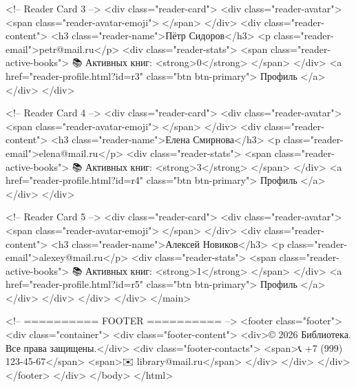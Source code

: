           <!-- Reader Card 3 -->
          <div class="reader-card">
            <div class="reader-avatar">
              <span class="reader-avatar-emoji">👤</span>
            </div>
            <div class="reader-content">
              <h3 class="reader-name">Пётр Сидоров</h3>
              <p class="reader-email">petr@mail.ru</p>
              <div class="reader-stats">
                <span class="reader-active-books">
                  📚 Активных книг: <strong>0</strong>
                </span>
              </div>
              <a href="reader-profile.html?id=r3" class="btn btn-primary">
                Профиль
              </a>
            </div>
          </div>

          <!-- Reader Card 4 -->
          <div class="reader-card">
            <div class="reader-avatar">
              <span class="reader-avatar-emoji">👤</span>
            </div>
            <div class="reader-content">
              <h3 class="reader-name">Елена Смирнова</h3>
              <p class="reader-email">elena@mail.ru</p>
              <div class="reader-stats">
                <span class="reader-active-books">
                  📚 Активных книг: <strong>3</strong>
                </span>
              </div>
              <a href="reader-profile.html?id=r4" class="btn btn-primary">
                Профиль
              </a>
            </div>
          </div>

          <!-- Reader Card 5 -->
          <div class="reader-card">
            <div class="reader-avatar">
              <span class="reader-avatar-emoji">👤</span>
            </div>
            <div class="reader-content">
              <h3 class="reader-name">Алексей Новиков</h3>
              <p class="reader-email">alexey@mail.ru</p>
              <div class="reader-stats">
                <span class="reader-active-books">
                  📚 Активных книг: <strong>1</strong>
                </span>
              </div>
              <a href="reader-profile.html?id=r5" class="btn btn-primary">
                Профиль
              </a>
            </div>
          </div>
        </div>
      </div>
    </main>

    <!-- ========== FOOTER ========== -->
    <footer class="footer">
      <div class="container">
        <div class="footer-content">
          <div>© 2026 Библиотека. Все права защищены.</div>
          <div class="footer-contacts">
            <span>📞 +7 (999) 123-45-67</span>
            <span>✉️ library@mail.ru</span>
          </div>
        </div>
      </div>
    </footer>
  </div>
</body>
</html>


